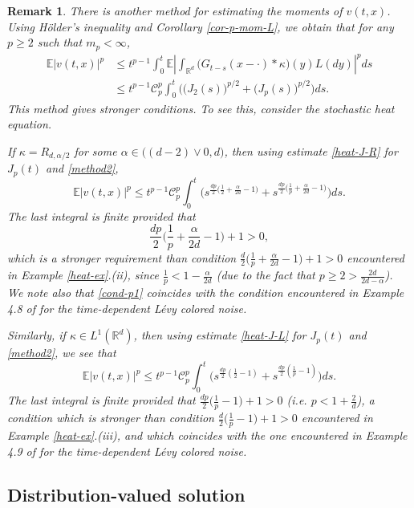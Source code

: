 \documentclass[12pt]{article}
\newtheorem{remark}[theorem]{Remark}
\def\cC{\mathcal{C}}
\def\bE{\mathbb{E}}
\def\bR{\mathbb{R}}
\def\k{\kappa}
\begin{document}
\begin{remark}
{\rm There is another method for estimating the moments of $v(t,x)$. Using H\"older's inequality and Corollary \ref{cor-p-mom-L}, we obtain that for any $p\geq 2$ such that $m_p<\infty$,
\begin{align}
\nonumber
\bE|v(t,x)|^p & \leq t^{p-1} \int_0^t \bE \left|\int_{\bR^d} \big(G_{t-s}(x-\cdot)*\k\big)(y)L(dy) \right|^p ds\\
\label{method2}
& \leq t^{p-1} \cC_p^p \int_0^t \Big( \big(J_2(s) \big)^{p/2}+ \big(J_p(s) \big)^{p/2}\Big)ds.
\end{align}
This method gives stronger conditions. To see this, consider the stochastic heat equation. 

If $\k=R_{d,\alpha/2}$ for some $\alpha \in \big((d-2)\vee 0, d\big)$, then using estimate \eqref{heat-J-R} for $J_p(t)$ and \eqref{method2}, 
\[
\bE|v(t,x)|^p \leq t^{p-1} \cC_p^p \int_0^t \Big(s^{\frac{dp}{2}\big(\frac{1}{2}+\frac{\alpha}{2d}-1\big)}+s^{\frac{dp}{2}\big(\frac{1}{p}+\frac{\alpha}{2d}-1\big)} \Big) ds.
\]
The last integral is finite provided that 
\begin{equation}
\label{cond-p1}
\frac{dp}{2}\Big(\frac{1}{p}+\frac{\alpha}{2d}-1 \Big)+1>0,
\end{equation}
which is a {\em stronger} requirement than condition $\frac{d}{2}\big(\frac{1}{p}+\frac{\alpha}{2d}-1 \big)+1>0$ encountered in Example \ref{heat-ex}.(ii), since $\frac{1}{p}<1-\frac{\alpha}{2d}$ (due to the fact that $p\geq 2>\frac{2d}{2d-\alpha}$). We note also that \eqref{cond-p1} coincides with the condition encountered in Example 4.8 of \cite{BJ26} for the time-dependent L\'evy colored noise.

Similarly, if $\k \in L^1(\bR^d)$, then using estimate \eqref{heat-J-L} for $J_p(t)$ and \eqref{method2}, we see that
\[
\bE|v(t,x)|^p \leq t^{p-1} \cC_p^p \int_0^t  \Big(s^{\frac{dp}{2}(\frac{1}{2}-1)}+s^{\frac{dp}{2}(\frac{1}{p}-1)} \Big) ds.
\]
The last integral is finite provided that $\frac{dp}{2}\big(\frac{1}{p}-1 \big)+1>0$ (i.e. $p<1+\frac{2}{d}$), a condition which is {\em stronger} than condition $\frac{d}{2}\big(\frac{1}{p}-1 \big)+1>0$ encountered in Example \ref{heat-ex}.(iii), and which coincides with the one encountered in Example 4.9 of \cite{BJ26} for the time-dependent L\'evy colored noise.
}
\end{remark}

\subsection{Distribution-valued solution}
\end{document}

